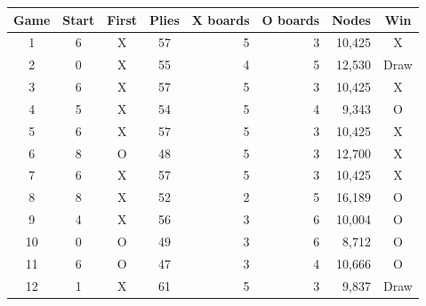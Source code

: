 \begin{tabular}{ccccrrrc}
\toprule
Game & Start & First & Plies & X boards & O boards & Nodes & Win \\
\midrule
1 & 6 & X & 57 & 5 & 3 & 10,425 & X \\
2 & 0 & X & 55 & 4 & 5 & 12,530 & Draw \\
3 & 6 & X & 57 & 5 & 3 & 10,425 & X \\
4 & 5 & X & 54 & 5 & 4 & 9,343 & O \\
5 & 6 & X & 57 & 5 & 3 & 10,425 & X \\
6 & 8 & O & 48 & 5 & 3 & 12,700 & X \\
7 & 6 & X & 57 & 5 & 3 & 10,425 & X \\
8 & 8 & X & 52 & 2 & 5 & 16,189 & O \\
9 & 4 & X & 56 & 3 & 6 & 10,004 & O \\
10 & 0 & O & 49 & 3 & 6 & 8,712 & O \\
11 & 6 & O & 47 & 3 & 4 & 10,666 & O \\
12 & 1 & X & 61 & 5 & 3 & 9,837 & Draw \\
\bottomrule
\end{tabular}
